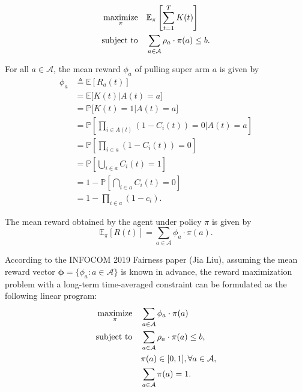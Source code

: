 \documentclass[12pt, a4paper]{article}
\begin{document}

\begin{equation}
	\begin{aligned}
		\mathop {\rm{maximize}}_{\pi} \quad & \mathbb{E}_{\pi} \left[ \sum\limits_{t = 1}^{T} K (t) \right]\\
		\rm{subject~to} \quad & \sum\limits_{a \in \mathcal{A}} \rho_a \cdot \pi(a) \leq b.
	\end{aligned}
\end{equation}

For all $a \in \mathcal{A}$, the mean reward $\phi_a$ of pulling super arm $a$ is given by
\begin{align*}
	\phi_a &\triangleq \mathbb{E} \left[ R_a (t) \right]\\
	&= \mathbb{E} \Big[ K(t) \Big\vert A(t) = a \Big]\\
	&= \mathbb{P} \Big[ K(t) = 1 \Big\vert A(t) = a \Big]\\
	&= \mathbb{P} \left[ \prod\limits_{i \in A(t)} \left( 1 - C_i (t) \right) = 0 \bigg\vert A(t) = a \right]\\
	&= \mathbb{P} \left[ \prod\limits_{i \in a} \left( 1 - C_i (t) \right) = 0 \right]\\
	&= \mathbb{P} \left[ \bigcup\limits_{i \in a} C_i (t) = 1 \right]\\
	&= 1 - \mathbb{P} \left[ \bigcap\limits_{i \in a} C_i (t) = 0 \right]\\
	&= 1 - \prod\limits_{i \in a} (1 - c_i).
\end{align*}

The mean reward obtained by the agent under policy $\pi$ is given by
\[
\mathbb{E}_{\pi} \left[ R (t) \right] = \sum\limits_{a \in \mathcal{A}} \phi_a \cdot \pi (a).
\]

According to the INFOCOM 2019 Fairness paper (Jia Liu), assuming the mean reward vector $\bm{\phi} = \{ \phi_a: a \in \mathcal{A} \}$ is known in advance, the reward maximization problem with a long-term time-averaged constraint can be formulated as the following linear program:
\begin{align}
	\begin{split}
		\mathop {\rm{maximize}}_{\pi} \quad & \sum\limits_{a \in \mathcal{A}} \phi_a \cdot \pi (a)\\
		\rm{subject~to} \quad & \sum\limits_{a \in \mathcal{A}} \rho_a \cdot \pi(a) \leq b,\\
		& \pi(a) \in [0, 1], \forall a \in \mathcal{A},\\
		& \sum\limits_{a \in \mathcal{A}} \pi(a) = 1.
		\label{eq:optimization_problem}
	\end{split}
\end{align}
\end{document}
